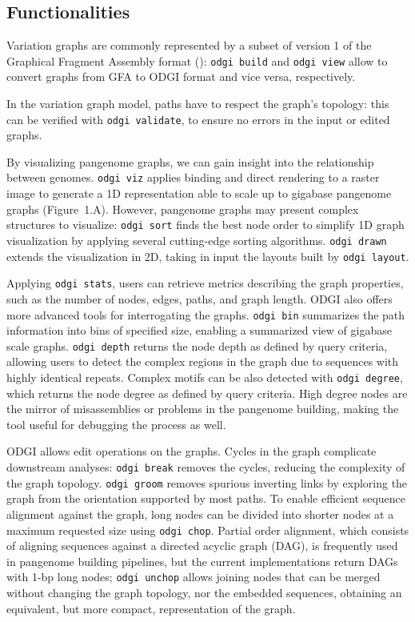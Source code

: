\documentclass{bioinfo}
\begin{document}
    \subsection{Functionalities}

    Variation graphs are commonly represented by a subset of version 1 of the Graphical Fragment Assembly format
    (\citep{GFAv1}): \texttt{odgi build} and \texttt{odgi view} allow to convert graphs from GFA to ODGI format and
    vice versa, respectively.

    In the variation graph model, paths have to respect the graph's topology: this can be verified with
    \texttt{odgi validate}, to ensure no errors in the input or edited graphs.

    By visualizing pangenome graphs, we can gain insight into the relationship between genomes. \texttt{odgi viz}
    applies binding and direct rendering to a raster image to generate a 1D representation able to scale up to gigabase
    pangenome graphs (Figure~1.A\vphantom{\ref{fig:01}}). However, pangenome graphs may present complex structures to
    visualize: \texttt{odgi sort} finds the best node order to simplify 1D graph visualization by applying several
    cutting-edge sorting algorithms. \texttt{odgi drawn} extends the visualization in 2D, taking in input the layouts
    built by \texttt{odgi layout}.

    Applying \texttt{odgi stats}, users can retrieve metrics describing the graph properties, such as the number of
    nodes, edges, paths, and graph length. ODGI also offers more advanced tools for interrogating the graphs.
    \texttt{odgi bin} summarizes the path information into bins of specified size, enabling a summarized view of
    gigabase scale graphs. \texttt{odgi depth} returns the node depth as defined by query criteria, allowing users to
    detect the complex regions in the graph due to sequences with highly identical repeats. Complex motifs can be also
    detected with \texttt{odgi degree}, which returns the node degree as defined by query criteria. High degree nodes
    are the mirror of misassemblies or problems in the pangenome building, making the tool useful for debugging the
    process as well.


    ODGI allows edit operations on the graphs. Cycles in the graph complicate downstream analyses: \texttt{odgi break}
    removes the cycles, reducing the complexity of the graph topology. \texttt{odgi groom} removes spurious inverting
    links by exploring the graph from the orientation supported by most paths. To enable efficient sequence alignment
    against the graph, long nodes can be divided into shorter nodes at a maximum requested size using
    \texttt{odgi chop}. Partial order alignment, which consists of aligning sequences against a directed acyclic graph
    (DAG), is frequently used in pangenome building pipelines, but the current implementations return DAGs with 1-bp
    long nodes; \texttt{odgi unchop} allows joining nodes that can be merged without changing the graph topology, nor
    the embedded sequences, obtaining an equivalent, but more compact, representation of the graph.
\end{document}
